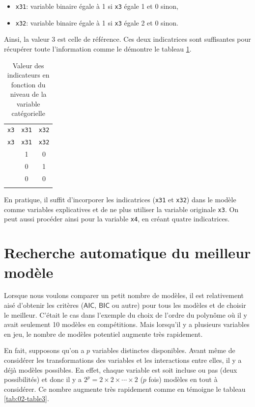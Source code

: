 \documentclass[
  11pt,
  letterpaper,
]{book}
\providecommand{\tightlist}{%
  \setlength{\itemsep}{0pt}\setlength{\parskip}{0pt}}
\theoremstyle{definition}
\theoremstyle{definition}
\theoremstyle{definition}
\theoremstyle{remark}
\begin{document}
\begin{itemize}
\tightlist
\item
  \texttt{x31}: variable binaire égale à 1 si \texttt{x3} égale 1 et 0 sinon,
\item
  \texttt{x32}: variable binaire égale à 1 si \texttt{x3} égale 2 et 0 sinon.
\end{itemize}

Ainsi, la valeur 3 est celle de référence. Ces deux indicatrices sont suffisantes pour récupérer toute l'information comme le démontre le tableau \ref{tab:02-dummy}.

\begin{longtable}[]{@{}ccc@{}}
\caption{\label{tab:02-dummy} Valeur des indicateurs en fonction du niveau de la variable catégorielle}\tabularnewline
\toprule
\texttt{x3} & \texttt{x31} & \texttt{x32} \\ \addlinespace
\midrule
\endfirsthead
\toprule
\texttt{x3} & \texttt{x31} & \texttt{x32} \\ \addlinespace
\midrule
\endhead
1 & 1 & 0 \\ \addlinespace
2 & 0 & 1 \\ \addlinespace
3 & 0 & 0 \\ \addlinespace
\bottomrule
\end{longtable}

En pratique, il suffit d'incorporer les indicatrices (\texttt{x31} et \texttt{x32}) dans le modèle comme variables explicatives et de ne plus utiliser la variable originale \texttt{x3}. On peut aussi procéder ainsi pour la variable \texttt{x4}, en créant quatre indicatrices.

\hypertarget{recherche-automatique-du-meilleur-moduxe8le}{%
\section{Recherche automatique du meilleur modèle}\label{recherche-automatique-du-meilleur-moduxe8le}}

Lorsque nous voulons comparer un petit nombre de modèles, il est relativement aisé d'obtenir les critères (\(\mathsf{AIC}\), \(\mathsf{BIC}\) ou autre) pour tous les modèles et de choisir le meilleur. C'était le cas dans l'exemple du choix de l'ordre du polynôme où il y avait seulement 10 modèles en compétitions.
Mais lorsqu'il y a plusieurs variables en jeu, le nombre de modèles potentiel augmente très rapidement.

En fait, supposons qu'on a \(p\) variables distinctes disponibles. Avant même de considérer les transformations des variables et les interactions entre elles, il y a déjà modèles possibles. En effet, chaque variable est soit incluse ou pas (deux possibilités) et donc il y a \(2^p=2\times 2 \times \cdots \times 2\) (\(p\) fois) modèles en tout à considérer. Ce nombre augmente très rapidement comme en témoigne le tableau \ref{tab:02-table3}.
\end{document}

